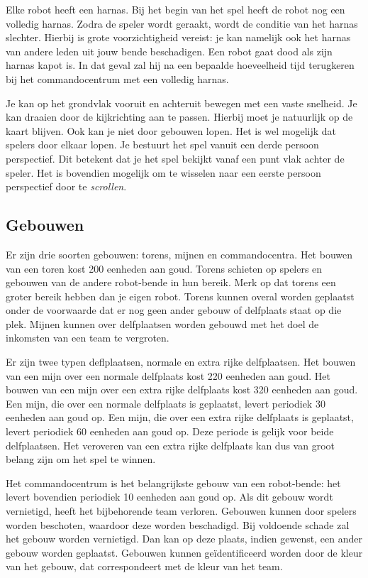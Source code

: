     Elke robot heeft een harnas. Bij het begin van het spel heeft de robot nog een volledig harnas. Zodra de speler wordt geraakt, wordt de conditie van het harnas slechter. Hierbij is grote voorzichtigheid vereist: je kan namelijk ook het harnas van andere leden uit jouw bende beschadigen. Een robot gaat dood als zijn harnas kapot is. In dat geval zal hij na een bepaalde hoeveelheid tijd terugkeren bij het commandocentrum met een volledig harnas.

    Je kan op het grondvlak vooruit en achteruit bewegen met een vaste snelheid. Je kan draaien door de kijkrichting aan te passen. Hierbij moet je natuurlijk op de kaart blijven. Ook kan je niet door gebouwen lopen. Het is wel mogelijk dat spelers door elkaar lopen. Je bestuurt het spel vanuit een derde persoon perspectief. Dit betekent dat je het spel bekijkt vanaf een punt vlak achter de speler. Het is bovendien mogelijk om te wisselen naar een eerste persoon perspectief door te \emph{scrollen}.

    \subsection{Gebouwen}
    Er zijn drie soorten gebouwen: torens, mijnen en commandocentra. Het bouwen van een toren kost 200 eenheden aan goud. Torens schieten op spelers en gebouwen van de andere robot-bende in hun bereik. Merk op dat torens een groter bereik hebben dan je eigen robot. Torens kunnen overal worden geplaatst onder de voorwaarde dat er nog geen ander gebouw of delfplaats staat op die plek. Mijnen kunnen over delfplaatsen worden gebouwd met het doel de inkomsten van een team te vergroten.

    Er zijn twee typen deflplaatsen, normale en extra rijke delfplaatsen. Het bouwen van een mijn over een normale delfplaats kost 220 eenheden aan goud. Het bouwen van een mijn over een extra rijke delfplaats kost 320 eenheden aan goud. Een mijn, die over een normale delfplaats is geplaatst, levert periodiek 30 eenheden aan goud op. Een mijn, die over een extra rijke delfplaats is geplaatst, levert periodiek 60 eenheden aan goud op. Deze periode is gelijk voor beide delfplaatsen. Het veroveren van een extra rijke delfplaats kan dus van groot belang zijn om het spel te winnen.

    Het commandocentrum is het belangrijkste gebouw van een robot-bende: het levert bovendien periodiek 10 eenheden aan goud op. Als dit gebouw wordt vernietigd, heeft het bijbehorende team verloren. Gebouwen kunnen door spelers worden beschoten, waardoor deze worden beschadigd. Bij voldoende schade zal het gebouw worden vernietigd. Dan kan op deze plaats, indien gewenst, een ander gebouw worden geplaatst. Gebouwen kunnen ge\"identificeerd worden door de kleur van het gebouw, dat correspondeert met de kleur van het team.

